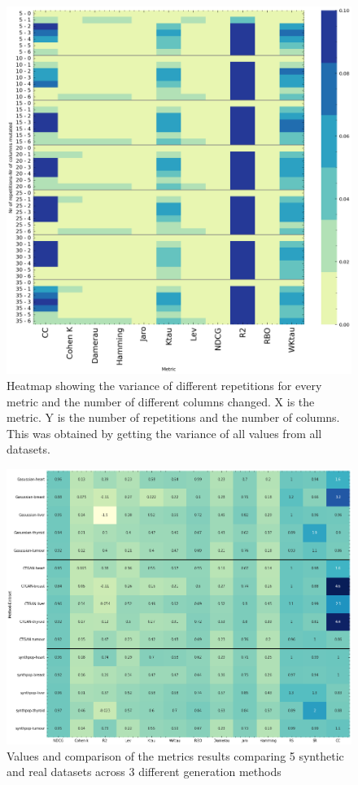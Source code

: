 \begin{figure}[htbp]
    \centering
    \caption{Heatmap showing the variance of different repetitions for every metric and the number of different columns changed. X is the metric. Y is the number of repetitions and the number of columns. This was obtained by getting the variance of all values from all datasets.  }\label{fig:nrruns} 
    \includegraphics[scale=0.60]{figures/heatmap-runs.png}
    \end{figure}


    \begin{figure}[htbp]
        \centering
        \caption{Values and comparison of the metrics results comparing 5 synthetic and real datasets across 3 different generation methods}\label{fig:synth_heat} 
       \includegraphics[scale=0.60]{figures/heatmap-synth.png}
        \end{figure}

